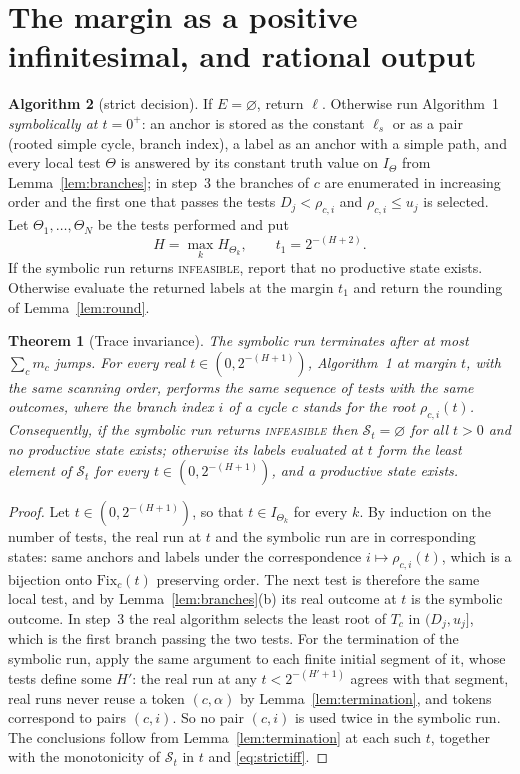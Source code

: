 \documentclass[11pt,a4paper]{article}
\theoremstyle{plain}
\newtheorem{theorem}{Theorem}[section]
\theoremstyle{definition}
\theoremstyle{remark}
\newcommand{\St}{\mathcal{S}_t}
\newcommand{\INF}{\textnormal{\textsc{infeasible}}}
\begin{document}
\section{The margin as a positive infinitesimal, and rational output}\label{sec:threshold}

\noindent\textbf{Algorithm 2} (strict decision). If $E=\varnothing$, return $\ell$. Otherwise run Algorithm~1 \emph{symbolically at $t=0^+$}: an anchor is stored as the constant $\ell_s$ or as a pair (rooted simple cycle, branch index), a label as an anchor with a simple path, and every local test $\Theta$ is answered by its constant truth value on $I_\Theta$ from Lemma~\ref{lem:branches}; in step~3 the branches of $c$ are enumerated in increasing order and the first one that passes the tests $D_j<\rho_{c,i}$ and $\rho_{c,i}\le u_j$ is selected. Let $\Theta_1,\dots,\Theta_N$ be the tests performed and put
\begin{equation}\label{eq:threshold}
  H=\max_k H_{\Theta_k},\qquad t_1=2^{-(H+2)} .
\end{equation}
If the symbolic run returns \INF, report that no productive state exists. Otherwise evaluate the returned labels at the margin $t_1$ and return the rounding of Lemma~\ref{lem:round}.

\begin{theorem}[Trace invariance]\label{thm:trace}
The symbolic run terminates after at most $\sum_cm_c$ jumps. For every real $t\in(0,2^{-(H+1)})$, Algorithm~1 at margin $t$, with the same scanning order, performs the same sequence of tests with the same outcomes, where the branch index $i$ of a cycle $c$ stands for the root $\rho_{c,i}(t)$. Consequently, if the symbolic run returns \INF{} then $\St=\varnothing$ for all $t>0$ and no productive state exists; otherwise its labels evaluated at $t$ form the least element of $\St$ for every $t\in(0,2^{-(H+1)})$, and a productive state exists.
\end{theorem}
\begin{proof}
Let $t\in(0,2^{-(H+1)})$, so that $t\in I_{\Theta_k}$ for every $k$. By induction on the number of tests, the real run at $t$ and the symbolic run are in corresponding states: same anchors and labels under the correspondence $i\mapsto\rho_{c,i}(t)$, which is a bijection onto $\mathrm{Fix}_c(t)$ preserving order. The next test is therefore the same local test, and by Lemma~\ref{lem:branches}(b) its real outcome at $t$ is the symbolic outcome. In step~3 the real algorithm selects the least root of $T_c$ in $(D_j,u_j]$, which is the first branch passing the two tests. For the termination of the symbolic run, apply the same argument to each finite initial segment of it, whose tests define some $H'$: the real run at any $t<2^{-(H'+1)}$ agrees with that segment, real runs never reuse a token $(c,\alpha)$ by Lemma~\ref{lem:termination}, and tokens correspond to pairs $(c,i)$. So no pair $(c,i)$ is used twice in the symbolic run. The conclusions follow from Lemma~\ref{lem:termination} at each such $t$, together with the monotonicity of $\St$ in $t$ and \eqref{eq:strictiff}.
\end{proof}
\end{document}
